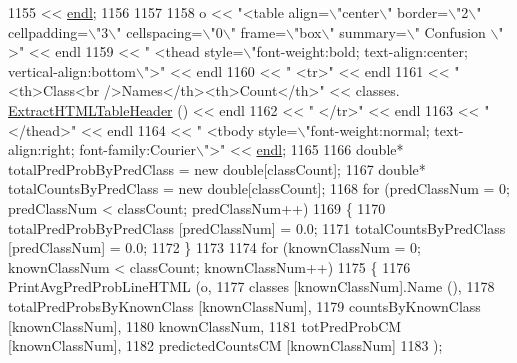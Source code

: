 \begin{DoxyCode}
{1155     << \hyperlink{namespace_k_k_b_ad1f50f65af6adc8fa9e6f62d007818a8}{endl};
1156 
1157 
1158   o << \textcolor{stringliteral}{"<table align=\(\backslash\)"center\(\backslash\)" border=\(\backslash\)"2\(\backslash\)" cellpadding=\(\backslash\)"3\(\backslash\)" cellspacing=\(\backslash\)"0\(\backslash\)" frame=\(\backslash\)"box\(\backslash\)"  summary=\(\backslash\)"
      Confusion \(\backslash\)" >"} << endl
1159     << \textcolor{stringliteral}{"  <thead style=\(\backslash\)"font-weight:bold; text-align:center; vertical-align:bottom\(\backslash\)">"}          << endl
1160     << \textcolor{stringliteral}{"    <tr>"}                                                                                << endl
1161     << \textcolor{stringliteral}{"        <th>Class<br />Names</th><th>Count</th>"} << classes.
      \hyperlink{class_k_k_m_l_l_1_1_m_l_class_list_a9fdbe03268aed67b977f28a48a26a85e}{ExtractHTMLTableHeader} ()    << endl
1162     << \textcolor{stringliteral}{"    </tr>"}                                                                               << endl
1163     << \textcolor{stringliteral}{"  </thead>"}                                                                              << endl
1164     << \textcolor{stringliteral}{"  <tbody style=\(\backslash\)"font-weight:normal; text-align:right; font-family:Courier\(\backslash\)">"} << 
      \hyperlink{namespace_k_k_b_ad1f50f65af6adc8fa9e6f62d007818a8}{endl};
1165 
1166   \textcolor{keywordtype}{double}*  totalPredProbByPredClass = \textcolor{keyword}{new} \textcolor{keywordtype}{double}[classCount];
1167   \textcolor{keywordtype}{double}*  totalCountsByPredClass   = \textcolor{keyword}{new} \textcolor{keywordtype}{double}[classCount];
1168   \textcolor{keywordflow}{for}  (predClassNum = 0;  predClassNum < classCount;  predClassNum++)
1169   \{
1170     totalPredProbByPredClass [predClassNum] = 0.0;
1171     totalCountsByPredClass   [predClassNum] = 0.0;
1172   \}
1173 
1174   \textcolor{keywordflow}{for}  (knownClassNum = 0;  knownClassNum < classCount;  knownClassNum++)
1175   \{
1176     PrintAvgPredProbLineHTML (o, 
1177                               classes                    [knownClassNum].Name (),
1178                               totalPredProbsByKnownClass [knownClassNum],
1179                               countsByKnownClass         [knownClassNum],
1180                               knownClassNum,
1181                               totPredProbCM              [knownClassNum],
1182                               predictedCountsCM          [knownClassNum]
1183                              );
}
\end{DoxyCode}
